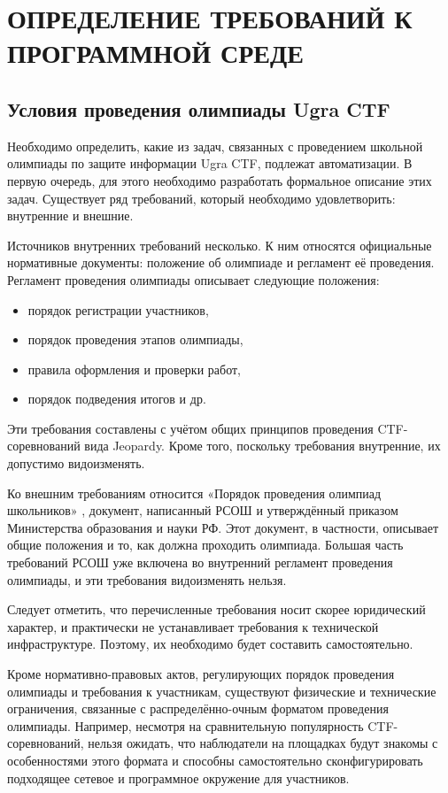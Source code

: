 \chapter{ОПРЕДЕЛЕНИЕ ТРЕБОВАНИЙ К ПРОГРАММНОЙ СРЕДЕ}



\section{Условия проведения олимпиады Ugra CTF}

Необходимо определить, какие из задач, связанных с проведением школьной олимпиады по защите информации Ugra CTF, подлежат автоматизации. В первую очередь, для этого необходимо разработать формальное описание этих задач. Существует ряд требований, который необходимо удовлетворить: внутренние и внешние.

Источников внутренних требований несколько. К ним относятся официальные нормативные документы: положение об олимпиаде и регламент её проведения. Регламент проведения олимпиады описывает следующие положения:

\begin{itemize}
\item порядок регистрации участников,
\item порядок проведения этапов олимпиады,
\item правила оформления и проверки работ,
\item порядок подведения итогов и др.
\end{itemize}

Эти требования составлены с учётом общих принципов проведения CTF-соревнований вида Jeopardy. Кроме того, поскольку требования внутренние, их допустимо видоизменять.

Ко внешним требованиям относится «Порядок проведения олимпиад школьников» \cite{Rosolymp}, документ, написанный РСОШ и утверждённый приказом Министерства образования и науки РФ. Этот документ, в частности, описывает общие положения и то, как должна проходить олимпиада. Большая часть требований РСОШ уже включена во внутренний регламент проведения олимпиады, и эти требования видоизменять нельзя.

Следует отметить, что перечисленные требования носит скорее юридический характер, и практически не устанавливает требования к технической инфраструктуре. Поэтому, их необходимо будет составить самостоятельно.

Кроме нормативно-правовых актов, регулирующих порядок проведения олимпиады и требования к участникам, существуют физические и технические ограничения, связанные с распределённо-очным форматом проведения олимпиады. Например, несмотря на сравнительную популярность CTF-соревнований, нельзя ожидать, что наблюдатели на площадках будут знакомы с особенностями этого формата и способны самостоятельно сконфигурировать подходящее сетевое и программное окружение для участников.

